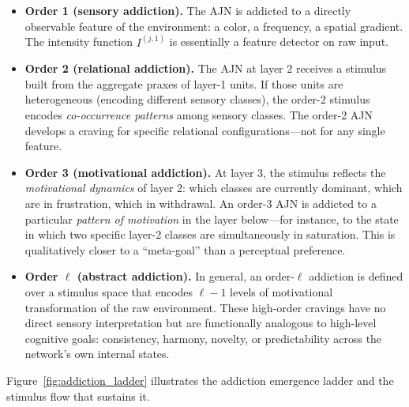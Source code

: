 \documentclass[12pt,a4paper]{article}
\begin{document}
\begin{itemize}
\item \textbf{Order 1 (sensory addiction).} The AJN is addicted to a directly
observable feature of the environment: a color, a frequency, a spatial gradient.
The intensity function $I^{(j,1)}$ is essentially a feature detector on raw input.

\item \textbf{Order 2 (relational addiction).} The AJN at layer 2 receives a
stimulus built from the aggregate praxes of layer-1 units. If those units are
heterogeneous (encoding different sensory classes), the order-2 stimulus encodes
\textit{co-occurrence patterns} among sensory classes. The order-2 AJN develops
a craving for specific relational configurations---not for any single feature.

\item \textbf{Order 3 (motivational addiction).} At layer 3, the stimulus reflects
the \textit{motivational dynamics} of layer 2: which classes are currently dominant,
which are in frustration, which in withdrawal. An order-3 AJN is addicted to a
particular \textit{pattern of motivation} in the layer below---for instance, to
the state in which two specific layer-2 classes are simultaneously in saturation.
This is qualitatively closer to a ``meta-goal'' than a perceptual preference.

\item \textbf{Order $\ell$ (abstract addiction).} In general, an order-$\ell$
addiction is defined over a stimulus space that encodes $\ell-1$ levels of
motivational transformation of the raw environment. These high-order cravings
have no direct sensory interpretation but are functionally analogous to
high-level cognitive goals: consistency, harmony, novelty, or predictability
across the network's own internal states.
\end{itemize}

Figure~\ref{fig:addiction_ladder} illustrates the addiction emergence ladder
and the stimulus flow that sustains it.
\end{document}
